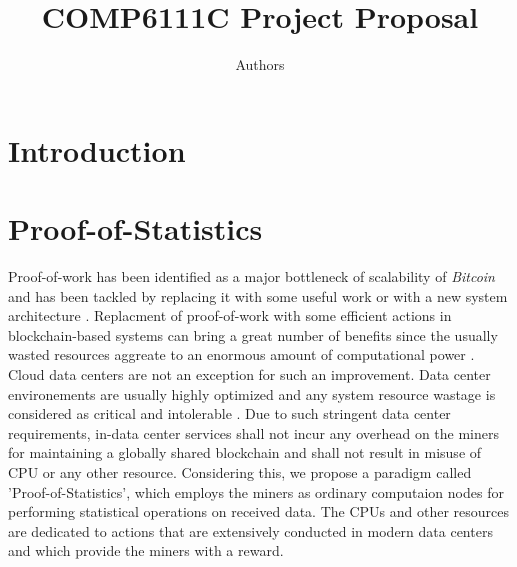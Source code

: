 \documentclass{article}
\title{COMP6111C Project Proposal}
\author{Authors}
\date{}
\begin{document}
\maketitle


\section{Introduction}


\section{Proof-of-Statistics}
Proof-of-work has been identified as a major bottleneck of scalability of \textit{Bitcoin}  and has been tackled by replacing it with some useful work \cite{filecoin-storage} or with a new system architecture \cite{RSCoin-bank}.  Replacment of proof-of-work with some  
efficient actions in blockchain-based systems can bring a great number of benefits since the usually wasted resources aggreate to an enormous amount of  computational power \cite{bitcoin-comp-elec-power}. Cloud data centers are not an exception for such an 
improvement. Data center environements are usually highly optimized and any system resource wastage is considered as critical and intolerable \cite{google-ai-power, facebook-cold-storage-rack}. Due to such stringent data center requirements, in-data center services
shall not incur any overhead on the miners for maintaining a globally shared blockchain and shall not result in misuse of CPU or any other resource. Considering this, we propose a paradigm called 'Proof-of-Statistics', which employs the miners as ordinary computaion nodes
for performing statistical operations on received data. The CPUs and other resources are dedicated to actions that are extensively conducted in modern data centers \cite{microsoft-autopilot} and which provide the miners with a reward. 
\end{document}
